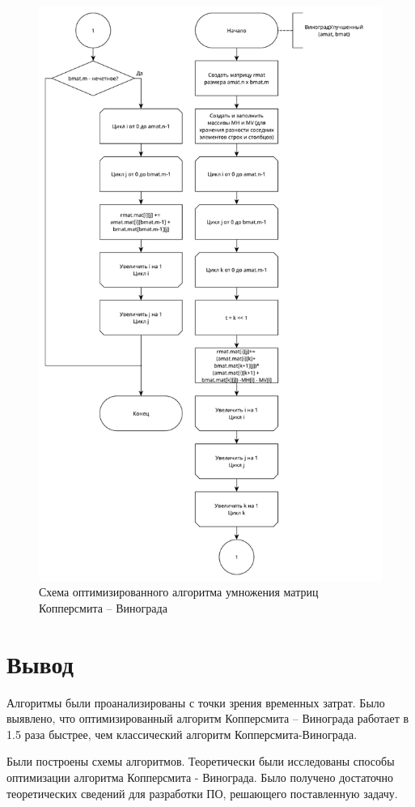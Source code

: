 \begin{figure}[ht!]
	\centering
	\includegraphics[width=0.82\linewidth]{assets/mtx-win2.pdf}
	\caption{Схема оптимизированного алгоритма умножения матриц Копперсмита -- Винограда}
	\label{fig:win-2}
\end{figure}

\newpage
\section*{Вывод}
Алгоритмы были проанализированы с точки зрения временных затрат. Было выявлено, что оптимизированный алгоритм Копперсмита -- Винограда работает в 1.5 раза быстрее, чем классический алгоритм Копперсмита-Винограда.


Были построены схемы алгоритмов. Теоретически были исследованы способы оптимизации алгоритма Копперсмита - Винограда. Было получено достаточно теоретических сведений для разработки ПО, решающего поставленную задачу.